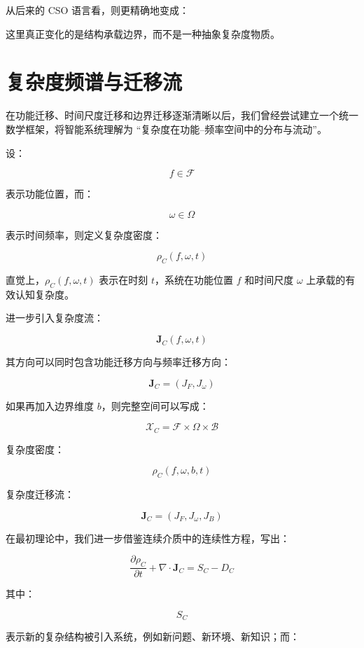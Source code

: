 从后来的 CSO 语言看，则更精确地变成：

\begin{statementbox}
\centering
{}
\end{statementbox}

这里真正变化的是结构承载边界，而不是一种抽象复杂度物质。

\section{复杂度频谱与迁移流}
\label{sec:complexity-spectrum-flow}

在功能迁移、时间尺度迁移和边界迁移逐渐清晰以后，我们曾经尝试建立一个统一数学框架，将智能系统理解为 ``复杂度在功能--频率空间中的分布与流动''。

设：

\[
f\in\mathcal F
\]

表示功能位置，而：

\[
\omega\in\Omega
\]

表示时间频率，则定义复杂度密度：

\[
\rho_C(f,\omega,t)
\]

直觉上，$\rho_C(f,\omega,t)$ 表示在时刻 $t$，系统在功能位置 $f$ 和时间尺度 $\omega$ 上承载的有效认知复杂度。

进一步引入复杂度流：

\[
\mathbf J_C(f,\omega,t)
\]

其方向可以同时包含功能迁移方向与频率迁移方向：

\[
\mathbf J_C
=
\left(
J_F,
J_\omega
\right)
\]

如果再加入边界维度 $b$，则完整空间可以写成：

\[
\mathcal X_C
=
\mathcal F
\times
\Omega
\times
\mathcal B
\]

复杂度密度：

\[
\rho_C(f,\omega,b,t)
\]

复杂度迁移流：

\[
\mathbf J_C
=
(
J_F,
J_\omega,
J_B
)
\]

在最初理论中，我们进一步借鉴连续介质中的连续性方程，写出：

\[
\frac{\partial \rho_C}{\partial t}
+
\nabla\cdot\mathbf J_C
=
S_C-D_C
\]

其中：

\[
S_C
\]

表示新的复杂结构被引入系统，例如新问题、新环境、新知识；而：

